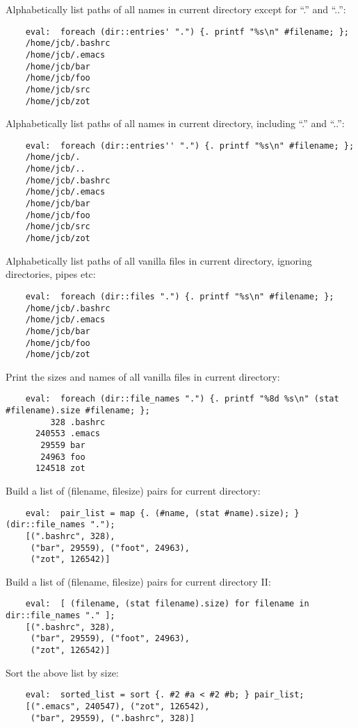 Alphabetically list paths of all names in current directory except for ``.'' and ``..'':
\begin{verbatim}
    eval:  foreach (dir::entries' ".") {. printf "%s\n" #filename; };
    /home/jcb/.bashrc
    /home/jcb/.emacs
    /home/jcb/bar
    /home/jcb/foo
    /home/jcb/src
    /home/jcb/zot
\end{verbatim}

Alphabetically list paths of all names in current directory, including ``.'' and ``..'':
\begin{verbatim}
    eval:  foreach (dir::entries'' ".") {. printf "%s\n" #filename; };
    /home/jcb/.
    /home/jcb/..
    /home/jcb/.bashrc
    /home/jcb/.emacs
    /home/jcb/bar
    /home/jcb/foo
    /home/jcb/src
    /home/jcb/zot
\end{verbatim}

Alphabetically list paths of all vanilla files in current directory, 
ignoring directories, pipes etc:
\begin{verbatim}
    eval:  foreach (dir::files ".") {. printf "%s\n" #filename; };
    /home/jcb/.bashrc
    /home/jcb/.emacs
    /home/jcb/bar
    /home/jcb/foo
    /home/jcb/zot
\end{verbatim}

Print the sizes and names of all vanilla files in current directory:
\begin{verbatim}
    eval:  foreach (dir::file_names ".") {. printf "%8d %s\n" (stat #filename).size #filename; };
         328 .bashrc
      240553 .emacs
       29559 bar
       24963 foo
      124518 zot
\end{verbatim}

Build a list of (filename, filesize) pairs for current directory:
\begin{verbatim}
    eval:  pair_list = map {. (#name, (stat #name).size); } (dir::file_names ".");
    [(".bashrc", 328), 
     ("bar", 29559), ("foot", 24963), 
     ("zot", 126542)]
\end{verbatim}

Build a list of (filename, filesize) pairs for current directory II:
\begin{verbatim}
    eval:  [ (filename, (stat filename).size) for filename in dir::file_names "." ];
    [(".bashrc", 328), 
     ("bar", 29559), ("foot", 24963), 
     ("zot", 126542)]
\end{verbatim}

Sort the above list by size:
\begin{verbatim}
    eval:  sorted_list = sort {. #2 #a < #2 #b; } pair_list;
    [(".emacs", 240547), ("zot", 126542),
     ("bar", 29559), (".bashrc", 328)]
\end{verbatim}

